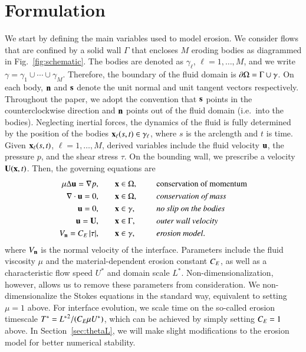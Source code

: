 \documentclass[preprint, 10pt]{elsarticle}
\begin{document}
\section{Formulation}
\label{s:formulation}
We start by defining the main variables used to model erosion.  We consider flows that are confined by a solid wall $\Gamma$ that encloses $M$ eroding bodies as diagrammed in Fig.~\ref{fig:schematic}.  The bodies are denoted as $\gamma_\ell$, $\ell=1,\ldots,M$, and we write $\gamma = \gamma_1 \cup \cdots \cup \gamma_M$.  Therefore, the boundary of the fluid domain is $\bd\Omega = \Gamma \cup \gamma$. On each body, $\nn$ and $\ss$ denote the unit normal and unit tangent vectors respectively.  Throughout the paper, we adopt the convention that $\ss$ points in the counterclockwise direction and $\nn$ points out of the fluid domain (i.e.~into the bodies). Neglecting inertial forces, the dynamics of the fluid is fully determined by the position of the bodies $\xx_\ell(s,t) \in \gamma_\ell$, where $s$ is the arclength and $t$ is time.  Given $\xx_\ell(s,t)$, $\ell=1,\ldots,M$, derived variables include the fluid velocity $\uu$, the pressure $p$, and the shear stress $\tau$.   On the bounding wall, we prescribe a velocity $\UU(\xx,t)$.  Then, the governing equations are
\begin{equation}
\label{eqn:erosionModel}
\begin{split}
  \mu \Delta \uu = \grad p, &\hspace{20pt} \xx \in \Omega, \gap &&\mbox{conservation
of momentum}\\
\grad \cdot \uu = 0, &\hspace{20pt} \xx \in \Omega, \gap &&\mbox{\em conservation of mass} \\
\uu = 0, &\hspace{20pt} \xx \in \gamma, \gap &&\mbox{\em no slip on the
bodies} \\
\uu = \UU, &\hspace{20pt} \xx \in \Gamma, \gap &&\mbox{\em outer wall
velocity} \\
\Vn = \CE \, \abs{\tau}, &\hspace{20pt} \xx \in \gamma,
&&\mbox{\em erosion model} .
\end{split}
\end{equation}
where $\Vn$ is the normal velocity of the interface. Parameters include the fluid viscosity $\mu$ and the material-dependent erosion constant $\CE$, as well as a characteristic flow speed $U^*$ and domain scale $L^*$. Non-dimensionalization, however, allows us to remove these parameters from consideration. We non-dimensionalize the Stokes equations in the standard way, equivalent to setting $\mu = 1$ above. For interface evolution, we scale time on the so-called erosion timescale $T^* = {L^*}^2/(\CE \mu U^*)$, which can be achieved by simply setting $\CE = 1$ above. In Section~\ref{sec:thetaL}, we will make slight modifications to the erosion model for better numerical stability.
\end{document}
